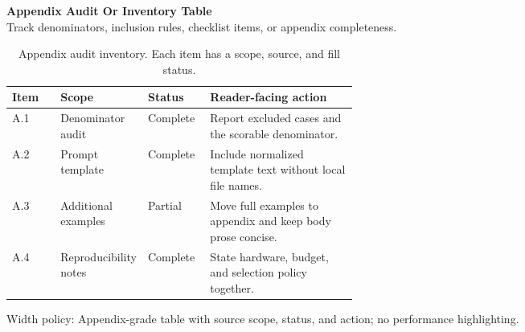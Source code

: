 \documentclass[10pt]{article}
\begin{document}
{\large\textbf{Appendix Audit Or Inventory Table}}\\[-0.05em]
{\footnotesize\textcolor{GroupText}{Track denominators, inclusion rules, checklist items, or appendix completeness.}}\\[0.35em]
\begin{table}[H]
\centering
\caption{Appendix audit inventory. Each item has a scope, source, and fill status.}
\label{tab:appendix-audit}
\small
\begin{tabularx}{\linewidth}{@{}L{0.14\linewidth}L{0.18\linewidth}L{0.18\linewidth}Y@{}}
\toprule
{}
\textbf{Item} & \textbf{Scope} & \textbf{Status} & \textbf{Reader-facing action} \\
\midrule
A.1 & Denominator audit & Complete & Report excluded cases and the scorable denominator. \\
A.2 & Prompt template & Complete & Include normalized template text without local file names. \\
A.3 & Additional examples & Partial & Move full examples to appendix and keep body prose concise. \\
A.4 & Reproducibility notes & Complete & State hardware, budget, and selection policy together. \\
\bottomrule
\end{tabularx}
\end{table}
\vfill
{\footnotesize\textcolor{GroupText}{Width policy: Appendix-grade table with source scope, status, and action; no performance highlighting.}}
\end{document}
